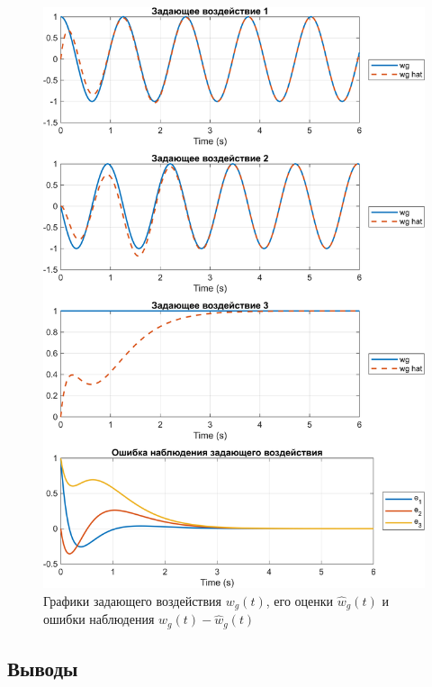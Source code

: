 \begin{figure}[H]
    \centering
    \includegraphics[width=0.9\linewidth]{figs/23_sim.png}
    \caption{Графики задающего воздействия $w_g(t)$, его оценки $\hat w_g(t)$ 
    и ошибки наблюдения $w_g(t)-\hat w_g(t)$}
    \label{fig:23}
\end{figure}

\subsection{Выводы}

